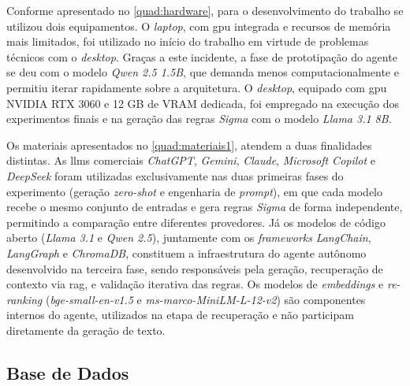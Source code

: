 Conforme apresentado no \autoref{quad:hardware}, para o desenvolvimento do trabalho se utilizou dois equipamentos. 
O \textit{laptop}, com \gls{gpu} integrada e recursos de memória mais limitados, foi utilizado no início do trabalho em virtude de problemas técnicos com o \textit{desktop}. 
Graças a este incidente, a fase de prototipação do agente se deu com o modelo \textit{Qwen 2.5 1.5B}, que demanda menos computacionalmente e permitiu iterar rapidamente sobre a arquitetura.
O \textit{desktop}, equipado com \gls{gpu} NVIDIA RTX 3060 e 12 GB de VRAM dedicada, foi empregado na execução dos experimentos finais e na geração das regras \textit{Sigma} com o modelo \textit{Llama 3.1 8B}. 

Os materiais apresentados no \ref{quad:materiais1}, atendem a duas finalidades distintas. 
As \gls{llm}s comerciais \textit{ChatGPT}, \textit{Gemini}, \textit{Claude}, \textit{Microsoft Copilot} e \textit{DeepSeek} foram utilizadas exclusivamente nas duas primeiras fases do experimento (geração \emph{zero-shot} e engenharia de \emph{prompt}), em que cada modelo recebe o mesmo conjunto de entradas e gera regras \emph{Sigma} de forma independente, permitindo a comparação entre diferentes provedores. 
Já os modelos de código aberto (\textit{Llama 3.1} e \textit{Qwen 2.5}), juntamente com os \emph{frameworks} \textit{LangChain}, \textit{LangGraph} e \textit{ChromaDB}, constituem a infraestrutura do agente autônomo desenvolvido na terceira fase, sendo responsáveis pela geração, recuperação de contexto via \gls{rag}, e validação iterativa das regras. 
Os modelos de \emph{embeddings} e \emph{re-ranking} (\textit{bge-small-en-v1.5} e \textit{ms-marco-MiniLM-L-12-v2}) são componentes internos do agente, utilizados na etapa de recuperação e não participam diretamente da geração de texto.

\subsection{Base de Dados}

